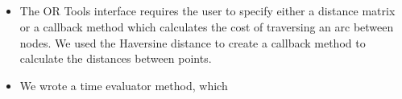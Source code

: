 \subsection{}


\begin{itemize}
    \item The OR Tools interface requires the user to specify either a distance matrix or a callback method which calculates the cost of traversing an arc between nodes. We used the Haversine distance to create a callback method to calculate the distances between points.
    \item We wrote a time evaluator method, which 
\end{itemize}



